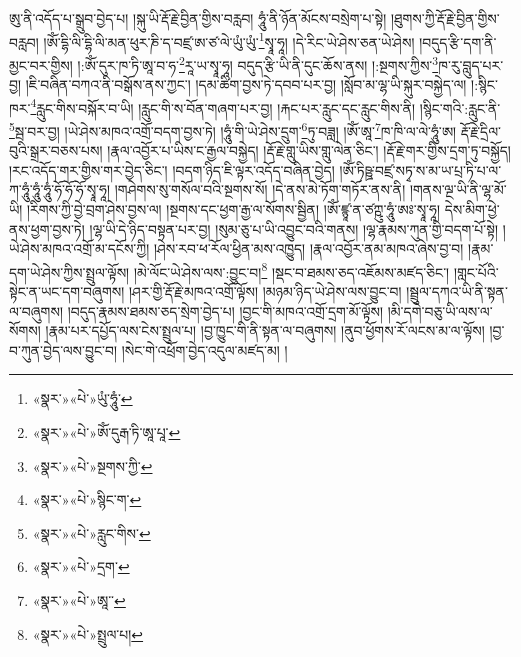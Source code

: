 ཨུ་ནི་འདོད་པ་སྒྲུབ་བྱེད་པ། །སྐུ་ཡི་རྡོ་རྗེ་བྱིན་གྱིས་བརླབ། ཧཱུཾ་ནི་ཉོན་མོངས་བསྲེག་པ་སྟེ། །ཐུགས་ཀྱི་རྡོ་རྗེ་བྱིན་གྱིས་བརླབ། །ཨོཾ་དྷི་ལི་དྷི་ལི་མན་ཕུར་ཎི་ད་བཛྲ་ཨ་ཙ་ལེ་ཡུཾ་ཡུཾ་\footnote{«སྣར་»«པེ་»ཡུཾ་ཧཱུཾ་}སྭཱ་ཧཱ། །དེ་རིང་ཡེ་ཤེས་ཅན་ཡེ་ཤེས། །བདུད་རྩི་དག་ནི་མྱང་བར་གྱིས། །:ཨོཾ་དུར་ཁ་ཏི་ཨཱ་བ་ཧ་\footnote{«སྣར་»«པེ་»ཨོཾ་དུརྒ་ཏི་ཨཱ་པཱ་}རཱ་ཡ་སྭཱ་ཧཱ། བདུད་རྩི་ཡི་ནི་དུང་ཆོས་ནས། །:སྔགས་ཀྱིས་\footnote{«སྣར་»«པེ་»སྔགས་ཀྱི་}ཁ་རུ་བླུད་པར་བྱ། །ཇི་བཞིན་བཀའ་ནི་བསྒོས་ནས་ཀྱང་། །དམ་ཚིག་བྱས་ཏེ་དབབ་པར་བྱ། །སློབ་མ་ལྷ་ཡི་སྐུར་བསྐྱེད་ལ། །:སྙིང་ཁར་\footnote{«སྣར་»«པེ་»སྙིང་ག་}རླུང་གིས་བསྐོར་བ་ཡི། །རླུང་གི་ས་བོན་གཞག་པར་བྱ། །རྐང་པར་རླུང་དང་རླུང་གིས་ནི། །སྙིང་གའི་:རླུང་ནི་\footnote{«སྣར་»«པེ་»རླུང་གིས་}སྦ་བར་བྱ། །ཡེ་ཤེས་མཁའ་འགྲོ་བདག་བྱས་ཏེ། །ཧཱུཾ་གི་ཡེ་ཤེས་དྲུག་\footnote{«སྣར་»«པེ་»དྲག་}ཏུ་བཟླ། །ཨོཾ་ཨཱ་\footnote{«སྣར་»«པེ་»ཨཱ་་}ཁ་ཁི་ལ་ལེ་ཧཱུཾ་ཨ། རྡོ་རྗེ་དྲིལ་བུའི་སྒྲར་བཅས་པས། །རྣལ་འབྱོར་པ་ཡིས་ང་རྒྱལ་བསྐྱེད། །རྡོ་རྗེ་གླུ་ཡིས་གླུ་ལེན་ཅིང་། །རྡོ་རྗེ་གར་གྱིས་དྲག་ཏུ་བསྐྱོད། །རང་འདོད་གར་གྱིས་གར་བྱེད་ཅིང་། །བདག་ཉིད་ཇི་ལྟར་འདོད་བཞིན་བྱེད། །ཨོཾ་ཏིཥྛ་བཛྲ་སཏྭ་ས་མ་ཡ་པྲ་ཏི་པ་ལ་ཀ་ཧཱུཾ་ཧཱུཾ་ཧཱུཾ་ཧོ་ཧོ་ཧོ་སྭཱ་ཧཱ། །གཤེགས་སུ་གསོལ་བའི་སྔགས་སོ། །དེ་ནས་མེ་ཏོག་གཏོར་ནས་ནི། །གནས་ལྔ་ཡི་ནི་ལྷ་མོ་ཡི། །རིགས་ཀྱི་བྱེ་བྲག་ཤེས་བྱས་ལ། །སྔགས་དང་ཕྱག་རྒྱ་ལ་སོགས་སྦྱིན། །ཨོཾ་ཛྙཱ་ན་ཙཀྵུ་ཧཱུཾ་ཨཿ་སྭཱ་ཧཱ། དེས་མིག་ཕྱེ་ནས་ཕྱག་བྱས་ཏེ། །ལྷ་ཡི་དེ་ཉིད་བསྟན་པར་བྱ། །སུམ་ཅུ་པ་ཡི་འབྱུང་བའི་གནས། །ལྷ་རྣམས་ཀུན་གྱི་བདག་པོ་སྟེ། །ཡེ་ཤེས་མཁའ་འགྲོ་མ་དངོས་ཀྱི། །ཤེས་རབ་ཕ་རོལ་ཕྱིན་མས་འཁྱུད། །རྣལ་འབྱོར་ནམ་མཁའ་ཞེས་བྱ་བ། །རྣམ་དག་ཡེ་ཤེས་ཀྱིས་སྤྲུལ་ལྟོས། །མེ་ལོང་ཡེ་ཤེས་ལས་:བྱུང་བ།\footnote{«སྣར་»«པེ་»སྤྲུལ་པ།} །སྡང་བ་ཐམས་ཅད་འཇོམས་མཛད་ཅིང་། །གླང་པོའི་སྟེང་ན་ཡང་དག་བཞུགས། །ཤར་གྱི་རྡོ་རྗེ་མཁའ་འགྲོ་ལྟོས། །མཉམ་ཉིད་ཡེ་ཤེས་ལས་བྱུང་བ། །སྦྲུལ་དཀའ་ཡི་ནི་སྟན་ལ་བཞུགས། །བདུད་རྣམས་ཐམས་ཅད་སྲེག་བྱེད་པ། །བྱང་གི་མཁའ་འགྲོ་དྲག་མོ་ལྟོས། །མི་དགེ་བཅུ་ཡི་ལས་ལ་སོགས། །རྣམ་པར་དཔྱོད་ལས་ངེས་སྤྲུལ་པ། །བྱ་ཁྱུང་གི་ནི་སྟན་ལ་བཞུགས། །ནུབ་ཕྱོགས་རོ་ལངས་མ་ལ་ལྟོས། །བྱ་བ་ཀུན་བྱེད་ལས་བྱུང་བ། །སེང་གེ་འཕྲོག་བྱེད་འདུལ་མཛད་མ། །
